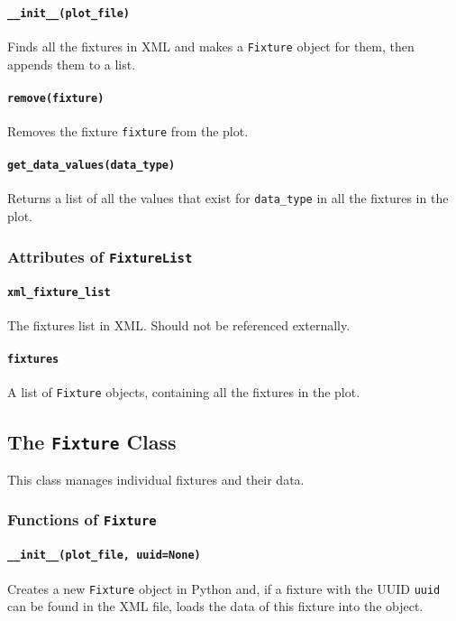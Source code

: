 \documentclass[a4paper]{article}
\begin{document}
\paragraph{\texttt{\_\_init\_\_(plot\_file)}}
Finds all the fixtures in XML and makes a \texttt{Fixture} object for them, 
then appends them to a list.

\paragraph{\texttt{remove(fixture)}}
Removes the fixture \texttt{fixture} from the plot.

\paragraph{\texttt{get\_data\_values(data\_type)}}
Returns a list of all the values that exist for \texttt{data\_type} in all the 
fixtures in the plot.

\subsubsection{Attributes of \texttt{FixtureList}}

\paragraph{\texttt{xml\_fixture\_list}}
The fixtures list in XML. Should not be referenced externally.

\paragraph{\texttt{fixtures}}
A list of \texttt{Fixture} objects, containing all the fixtures in the plot.

\subsection{The \texttt{Fixture} Class}
This class manages individual fixtures and their data.

\subsubsection{Functions of \texttt{Fixture}}

\paragraph{\texttt{\_\_init\_\_(plot\_file, uuid=None)}}
Creates a new \texttt{Fixture} object in Python and, if a fixture with the 
UUID \texttt{uuid} can be found in the XML file, loads the data of this 
fixture into the object.
\end{document}
